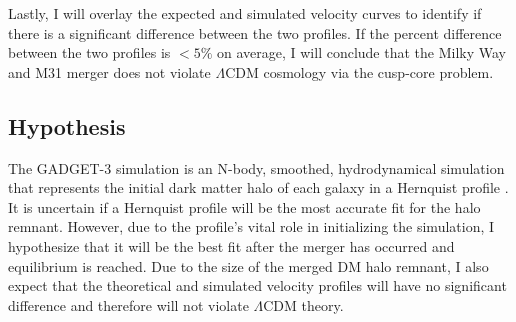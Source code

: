 Lastly, I will overlay the expected and simulated velocity curves to identify if there is a significant difference between the two profiles. If the percent difference between the two profiles is $ <5\% $ on average, I will conclude that the Milky Way and M31 merger does not violate $\Lambda$CDM cosmology via the cusp-core problem. 

%

\subsection{Hypothesis}
The GADGET-3 simulation is an N-body, smoothed, hydrodynamical simulation that represents the initial dark matter halo of each galaxy in a Hernquist profile \cite{vanderMarel2012}. It is uncertain if a Hernquist profile will be the most accurate fit for the halo remnant. However, due to the profile's vital role in initializing the simulation, I hypothesize that it will be the best fit after the merger has occurred and equilibrium is reached. Due to the size of the merged DM halo remnant, I also expect that the theoretical and simulated velocity profiles will have no significant difference and therefore will not violate $\Lambda$CDM theory.